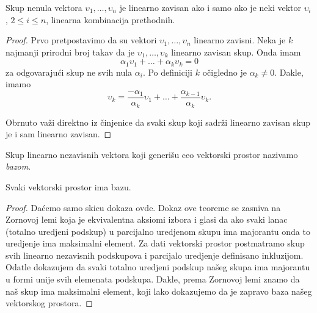 \documentclass{article}
\begin{document}
\begin{theorem}
  Skup nenula vektora $\upsilon_1, \ldots, \upsilon_n$ je linearno zavisan ako i samo ako je neki vektor $\upsilon_i$, $2 \le i \le n$, linearna kombinacija prethodnih.
\end{theorem}

\begin{proof}
  Prvo pretpostavimo da su vektori $\upsilon_1 , \ldots, \upsilon_n$ linearno zavisni.
  Neka je $k$ najmanji prirodni broj takav da je $\upsilon_1 , \ldots, \upsilon_k$ linearno zavisan skup.
  Onda imam 
  \[\alpha_1 \upsilon_1 + \ldots + \alpha_k \upsilon_k = 0\]
  za odgovarajući skup ne svih nula $\alpha_i$.
  Po definiciji $k$ očigledno je $\alpha_k \neq 0$.
  Dakle, imamo
  \[\upsilon_k = \frac{-\alpha_1}{\alpha_k} \upsilon_1 + \ldots + \frac{\alpha_{k - 1}}{\alpha_k} \upsilon_k.\]

  Obrnuto važi direktno iz činjenice da svaki skup koji sadrži linearno zavisan skup je i sam linearno zavisan.
\end{proof}

\begin{definition}[Baza]
  Skup linearno nezavisnih vektora koji generišu ceo vektorski prostor nazivamo \textit{bazom}.
\end{definition}

\begin{theorem}
  Svaki vektorski prostor ima bazu.
\end{theorem}

\begin{proof}
  Daćemo samo skicu dokaza ovde.
  Dokaz ove teoreme se zasniva na Zornovoj lemi koja je ekvivalentna aksiomi izbora i glasi da ako svaki lanac (totalno uredjeni podskup) u parcijalno uredjenom skupu ima majorantu onda to uredjenje ima maksimalni element.
  Za dati vektorski prostor postmatramo skup svih linearno nezavisnih podskupova i parcijalo uredjenje definisano inkluzijom.
  Odatle dokazujem da svaki totalno uredjeni podskup našeg skupa ima majorantu u formi unije svih elemenata podskupa.
  Dakle, prema Zornovoj lemi znamo da naš skup ima maksimalni element, koji lako dokazujemo da je zapravo baza našeg vektorskog prostora.
\end{proof}
\end{document}
